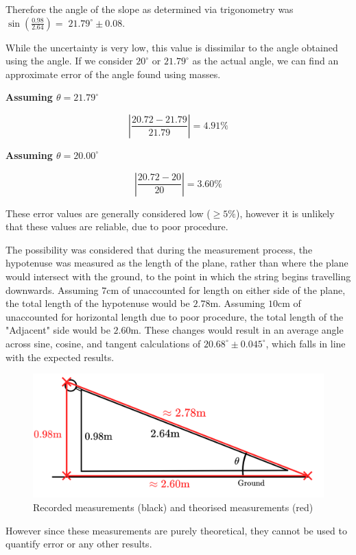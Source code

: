 \documentclass[11pt,a4paper]{article}
\begin{document}
 
 
 
 Therefore the angle of the slope as determined via trigonometry was $\sin\left({\frac{0.98}{2.64}}\right)=\;21.79^\circ \pm0.08$.
 


While the uncertainty is very low, this value is dissimilar to the angle obtained using the angle. If we consider $20^\circ$ or $21.79^\circ$ as the actual angle, we can find an approximate error of the angle found using masses.
\begin{center}
	\begin{large}
		
		\textbf{Assuming $\theta=21.79^\circ$}
	\end{large}
\end{center}

$$|\frac{20.72-21.79}{21.79}|=4.91\%$$
\begin{center}
	\begin{large}
		
		\textbf{Assuming $\theta=20.00^\circ$}
	\end{large}
\end{center}

$$|\frac{20.72-20}{20}|=3.60\%$$

These error values are generally considered low ($\geq5\%$), however it is unlikely that these values are reliable, due to poor procedure.

The possibility was considered that during the measurement process, the hypotenuse was measured as the length of the plane, rather than where the plane would intersect with the ground, to the point in which the string begins travelling downwards. Assuming $7$cm of unaccounted for length on either side of the plane, the total length of the hypotenuse would be $2.78$m. Assuming $10$cm of unaccounted for horizontal length due to poor procedure, the total length of the "Adjacent" side would be $2.60$m. These changes would result in an average angle across sine, cosine, and tangent calculations of $20.68^\circ \pm0.045^\circ$, which falls in line with the expected results.

\begin{figure}[H]
	\centering
	\includegraphics[width=0.5\paperwidth]{./Diagrams/LengthDiagramRevised.png}
	\caption{Recorded measurements (black) and theorised measurements (red)}
\end{figure}
However since these measurements are purely theoretical, they cannot be used to quantify error or any other results.
\end{document}
